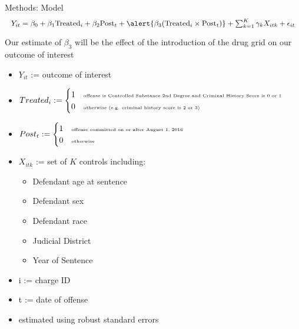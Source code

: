 \documentclass[10pt]{beamer}
\begin{document}
\begin{frame}{Methods: Model}
    \[
    \resizebox{1.0\textwidth}{!}{$
    Y_{it} = \beta_0 + \beta_1 \text{Treated}_i + \beta_2 \text{Post}_t + \alert{\beta_3 (\text{Treated}_i \times \text{Post}_t)} + \sum_{k=1}^{K} \gamma_k X_{itk} + \epsilon_{it}
    $}
    \]
    \begin{center}
        \alert{Our estimate of $\beta_3$ will be the effect of the introduction of the drug grid on our outcome of interest}
    \end{center}
    {\scriptsize
    \begin{itemize}
        \item $Y_{it}$ := outcome of interest
        \item $Treated_i := \begin{cases} 
                                      1 & \tiny \text{offense is Controlled Substance 2nd Degree and Criminal History Score is 0 or 1}  \\
                                      0 & \tiny \text{otherwise (e.g. criminal history score is 2 or 3)}  \\
                                \end{cases}$
        \item $Post_t := \begin{cases} 
                                      1 & \tiny \text{offense committed on or after August 1, 2016}  \\
                                      0 & \tiny \text{otherwise}  \\
                                \end{cases}$ 
        \item $X_{itk}$ := set of $K$ controls including:
        \begin{itemize}
            \item \scriptsize Defendant age at sentence
            \item Defendant sex
            \item Defendant race
            \item Judicial District
            \item Year of Sentence
        \end{itemize}
        \item i := charge ID
        \item t := date of offense
        \item estimated using robust standard errors
    \end{itemize}
    }
\end{frame}
\end{document}
